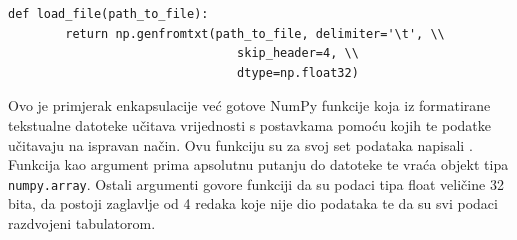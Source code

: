 \documentclass[times, utf8, diplomski]{fer}
\begin{document}
\begin{lstlisting}[caption=Funkcija za učitavanje HuGaDB podataka, label=load]
    def load_file(path_to_file):
        return np.genfromtxt(path_to_file, delimiter='\t', \\
                                skip_header=4, \\
                                dtype=np.float32)
\end{lstlisting}

Ovo je primjerak enkapsulacije već gotove NumPy funkcije koja iz formatirane tekstualne datoteke učitava vrijednosti s 
postavkama pomoću kojih te podatke učitavaju na ispravan način. Ovu funkciju su za svoj set podataka napisali \cite{HuGaDB}.
Funkcija kao argument prima apsolutnu putanju do
datoteke te vraća objekt tipa \texttt{numpy.array}. Ostali argumenti govore funkciji da su podaci tipa
float veličine 32 bita, da postoji zaglavlje od 4 redaka koje nije dio podataka te da su svi podaci razdvojeni
tabulatorom.
\end{document}
